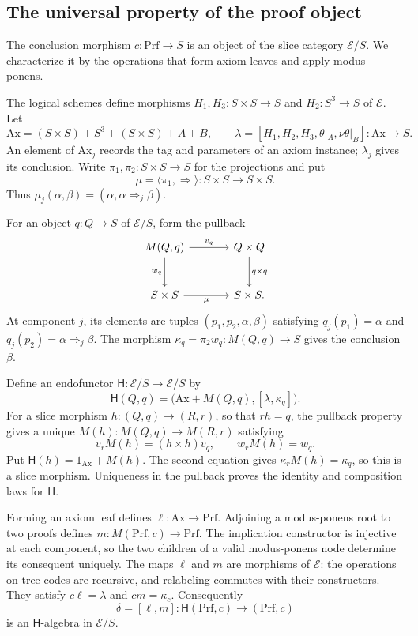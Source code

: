 \documentclass[11pt]{article}
\begin{document}
\subsection{The universal property of the proof object}\label{app:proof-initial}

The conclusion morphism $c:\mathrm{Prf}\to S$ is an object of the
slice category $\mathcal E/S$. We characterize it by the operations
that form axiom leaves and apply modus ponens.

The logical schemes define morphisms
$H_1,H_3:S\times S\to S$ and $H_2:S^3\to S$ of $\mathcal E$.
Let
\[
 \mathrm{Ax}=(S\times S)+S^3+(S\times S)+A+B,
 \qquad
 \lambda=[H_1,H_2,H_3,\theta|_A,\nu\theta|_B]:
       \mathrm{Ax}\longrightarrow S.
\]
An element of $\mathrm{Ax}_j$ records the tag and parameters of an
axiom instance; $\lambda_j$ gives its conclusion.
Write $\pi_1,\pi_2:S\times S\to S$ for the projections and put
\[
 \mu=\langle\pi_1,\Rightarrow\rangle:S\times S\longrightarrow S\times S.
\]
Thus $\mu_j(\alpha,\beta)=(\alpha,\alpha\Rightarrow_j\beta)$.

For an object $q:Q\to S$ of $\mathcal E/S$, form the pullback
\[
\begin{tikzcd}[column sep=large,row sep=large]
 M(Q,q) \arrow[r,"v_q"] \arrow[d,"w_q"'] &
 Q\times Q \arrow[d,"q\times q"] \\
 S\times S \arrow[r,"\mu"'] & S\times S.
\end{tikzcd}
\]
At component $j$, its elements are tuples
$(p_1,p_2,\alpha,\beta)$ satisfying
$q_j(p_1)=\alpha$ and
$q_j(p_2)=\alpha\Rightarrow_j\beta$.
The morphism
$\kappa_q=\pi_2w_q:M(Q,q)\to S$ gives the conclusion $\beta$.

Define an endofunctor $\mathsf H:\mathcal E/S\to\mathcal E/S$ by
\[
 \mathsf H(Q,q)=
 \bigl(\mathrm{Ax}+M(Q,q),[\lambda,\kappa_q]\bigr).
\]
For a slice morphism $h:(Q,q)\to(R,r)$, so that $rh=q$,
the pullback property gives a unique
$M(h):M(Q,q)\to M(R,r)$ satisfying
\[
 v_rM(h)=(h\times h)v_q,\qquad w_rM(h)=w_q.
\]
Put $\mathsf H(h)=1_{\mathrm{Ax}}+M(h)$.
The second equation gives $\kappa_rM(h)=\kappa_q$, so this is a
slice morphism. Uniqueness in the pullback proves the identity and
composition laws for $\mathsf H$.

Forming an axiom leaf defines $\ell:\mathrm{Ax}\to\mathrm{Prf}$.
Adjoining a modus-ponens root to two proofs defines
$m:M(\mathrm{Prf},c)\to\mathrm{Prf}$.
The implication constructor is injective at each component, so the two
children of a valid modus-ponens node determine its consequent uniquely.
The maps $\ell$ and $m$ are morphisms of $\mathcal E$: the operations on tree codes
are recursive, and relabeling commutes with their constructors.
They satisfy $c\ell=\lambda$ and $cm=\kappa_c$.
Consequently
\[
 \delta=[\ell,m]:\mathsf H(\mathrm{Prf},c)
                     \longrightarrow(\mathrm{Prf},c)
\]
is an $\mathsf H$-algebra in $\mathcal E/S$.
\end{document}
